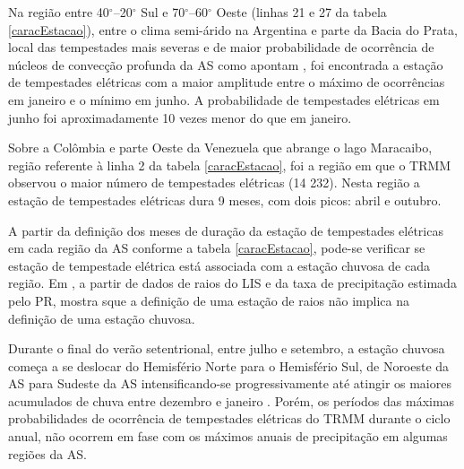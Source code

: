 
Na região entre 40$^{\circ}$--20$^{\circ}$ Sul e 70$^{\circ}$--60$^{\circ}$ Oeste (linhas 21 e 27 da tabela \ref{caracEstacao}),  entre o clima semi-árido na Argentina e parte da Bacia do Prata,  local das tempestades mais severas e de maior probabilidade de ocorrência de núcleos de convecção profunda da AS como apontam , foi encontrada a estação de tempestades elétricas com a maior amplitude entre o máximo de ocorrências em janeiro e o mínimo em junho. A probabilidade de tempestades elétricas em junho foi aproximadamente 10 vezes menor do que em janeiro.

Sobre a Colômbia e parte Oeste da Venezuela que abrange o lago Maracaibo, região referente à linha 2 da tabela \ref{caracEstacao}, foi a região em que o TRMM observou o maior número de tempestades elétricas ({14 232}). Nesta região a estação de tempestades elétricas dura  9 meses, com dois picos: abril e outubro.


A partir da definição dos meses de duração da estação de tempestades elétricas em cada região da AS conforme a tabela \ref{caracEstacao}, pode-se verificar se estação de tempestade elétrica está associada com a estação chuvosa de cada região. Em , a partir de dados de raios do LIS e da taxa de precipitação estimada pelo PR, mostra sque a definição de uma estação de raios não implica na definição de uma estação chuvosa. 

Durante o final do verão setentrional, entre julho e setembro, a estação chuvosa começa a se deslocar do Hemisfério Norte para o Hemisfério Sul, de Noroeste da AS para Sudeste da AS intensificando-se progressivamente até atingir os maiores acumulados de chuva entre dezembro e janeiro \cite{grimm2003nino,reboita2010regimes,Marengo2012,shi-atlas,bombardi2008variabilidade,cusdodioTese}. Porém, os períodos 
das máximas probabilidades de ocorrência de tempestades elétricas do TRMM durante o ciclo anual, não ocorrem em fase com os máximos anuais de precipitação em algumas regiões da AS.
 
